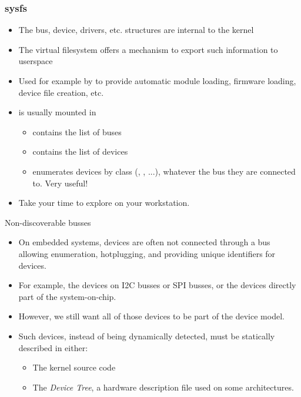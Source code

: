 \begin{frame}
  \frametitle{sysfs}
  \begin{itemize}
  \item The bus, device, drivers, etc. structures are internal to the
    kernel
  \item The  virtual filesystem offers a mechanism to
    export such information to userspace
  \item Used for example by  to provide automatic module loading,
    firmware loading, device file creation, etc.
  \item {} is usually mounted in 
    \begin{itemize}
    \item {} contains the list of buses
    \item {} contains the list of devices
    \item {} enumerates devices by class (,
      , ...), whatever the bus they are connected
      to. Very useful!
    \end{itemize}
  \item Take your time to explore  on your workstation.
  \end{itemize}
\end{frame}

\begin{frame}{Non-discoverable busses}
  \begin{itemize}
  \item On embedded systems, devices are often not connected through a
    bus allowing enumeration, hotplugging, and providing unique
    identifiers for devices.
  \item For example, the devices on I2C busses or SPI busses, or the
    devices directly part of the system-on-chip.
  \item However, we still want all of those devices to be part of the
    device model.
  \item Such devices, instead of being dynamically detected, must be
    statically described in either:
    \begin{itemize}
    \item The kernel source code
    \item The {\em Device Tree}, a hardware description file used on
      some architectures.
    \end{itemize}
  \end{itemize}
\end{frame}

